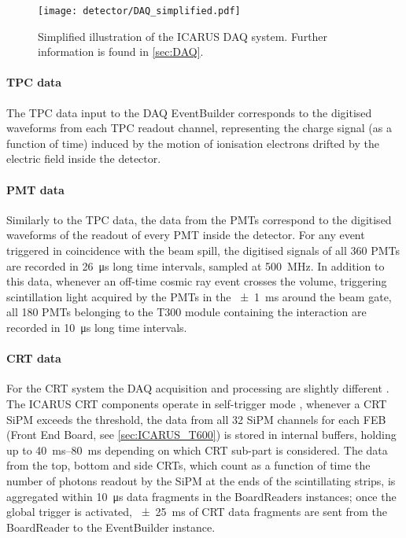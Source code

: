 \begin{figure}
    \centering
    \texttt{[image: detector/DAQ\_simplified.pdf]}
    \caption[ICARUS DAQ illustration]{Simplified illustration of the ICARUS DAQ system. Further information is found in \autoref{sec:DAQ}. }
    \label{fig:DAQ}
\end{figure}

\paragraph{TPC data} The TPC data input to the DAQ EventBuilder corresponds to the digitised waveforms from each TPC readout channel, representing the charge signal (as a function of time) induced by the motion of ionisation electrons drifted by the electric field inside the detector. 

\paragraph{PMT data} Similarly to the TPC data, the data from the PMTs correspond to the digitised waveforms of the readout of every PMT inside the detector. For any event triggered in coincidence with the beam spill, the digitised signals of all 360 PMTs are recorded in \SI{26}{\us} long time intervals, sampled at \SI{500}{\mega\hertz}. In addition to this data, whenever an off-time cosmic ray event crosses the volume, triggering scintillation light acquired by the PMTs in the \SI{+-1}{\ms} around the beam gate, all 180 PMTs belonging to the T300 module containing the interaction are recorded in \SI{10}{\us} long time intervals. 

\paragraph{CRT data} For the CRT system the DAQ acquisition and processing are slightly different \cite{ICARUS:2025rdw,Poppi:2023zmp,Poppi:2022vhg}. The ICARUS CRT components operate in self-trigger mode \cite{arteroponsStudyReconstructionNuMuCC, ICARUS:2025rdw}, whenever a CRT SiPM exceeds the threshold, the data from all 32 SiPM channels for each FEB (Front End Board, see \autoref{sec:ICARUS_T600}) is stored in internal buffers, holding up to \qtyrange{40}{80}{\ms} depending on which CRT sub-part is considered. The data from the top, bottom and side CRTs, which count as a function of time the number of photons readout by the SiPM at the ends of the scintillating strips, is aggregated within \SI{10}{\us} data fragments in the BoardReaders instances; once the global trigger is activated, \SI{+-25}{\ms} of CRT data fragments are sent from the BoardReader to the EventBuilder instance. 


